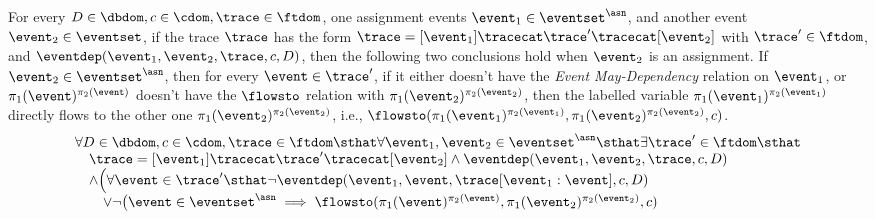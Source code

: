 %
%
%
%
\begin{lem}
		\label{lem:inv_indepevents_asn}
		For every $D \in \dbdom , c \in \cdom, \trace \in \ftdom$, one assignment events 
		$\event_1\in \eventset^{\asn}$, and another event $\event_2 \in \eventset$,
		if the trace $\trace$ has the form $\trace = [\event_1] \tracecat \trace' \tracecat [\event_2]$ with $\trace' \in \ftdom$, 
		and $\eventdep(\event_1, \event_2, \trace, c, D)$,
		then the following two conclusions hold when $\event_2$ is an assignment.
		If $\event_2 \in \eventset^{\asn}$,
		then for every $\event \in \trace'$, 
		if it either doesn't have the \emph{Event May-Dependency} relation on $\event_1$, 
		or $\pi_1(\event)^{\pi_2(\event)}$ doesn't have the $\flowsto$ relation with $ \pi_1(\event_2)^{\pi_2(\event_2)}$,
		then the labelled variable $\pi_1(\event_1)^{\pi_2(\event_1)}$ directly flows to the other one $\pi_1(\event_2)^{\pi_2(\event_2)}$, 
		i.e., $\flowsto(\pi_1(\event_1)^{\pi_2(\event_1)}, \pi_1(\event_2)^{\pi_2(\event_2)}, c)$.
		\[
		\begin{array}{l}
			\forall D \in \dbdom , c \in \cdom, \trace \in \ftdom \sthat  \forall \event_1, \event_2 \in \eventset^{\asn} \sthat 
			 \exists \trace' \in \ftdom \sthat
			 \\ \quad 
			 \trace = [\event_1] \tracecat \trace' \tracecat [\event_2]
			 \land
			\eventdep(\event_1, \event_2, \trace, c, D) 
			\\ \quad 
			\land 
			\Big( 
			\forall \event \in \trace' \sthat  
				\neg \eventdep(\event_1, \event, \trace[\event_1:\event], c, D)
				\\ \qquad 
				\lor 
				\neg \big( 
					\event \in \eventset^{\asn} \implies 
					\flowsto(\pi_1(\event)^{\pi_2(\event)}, \pi_1(\event_2)^{\pi_2(\event_2)}, c)

\end{array}\]
\end{lem}
